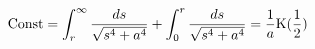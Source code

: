 \begin{equation}
{\rm{Const}}=\int^{\infty}_{r}{\frac{ds}{\sqrt{s^4+a^4}}}+\int^{r}_{0}
{\frac{ds}{\sqrt{s^4+a^4}}}=\frac{1}{a}{\rm K}(\frac{1}{2})
\end{equation}

